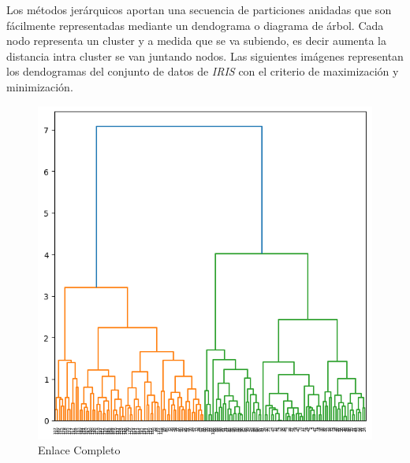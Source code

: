 \noindent Los métodos jerárquicos aportan una secuencia de particiones anidadas que son fácilmente representadas mediante un dendograma o diagrama de árbol. 
Cada nodo representa un cluster y a medida que se va subiendo, es decir aumenta la distancia intra cluster se van juntando nodos. Las siguientes imágenes representan los dendogramas del conjunto de datos de \emph{IRIS} \cite{Iris Fisher} con el criterio de maximización y minimización. 

\begin{figure}[ht]
  \centering

  \begin{minipage}{0.4\textwidth}
    \centering
    \includegraphics[width=\textwidth]{Documentos Extra/Imagenes/complete_linkage.png}
    \caption{Enlace Completo}
    \label{fig:imagen1}
  \end{minipage}
  \hfill
  \begin{minipage}{0.4\textwidth}
    \centering

\end{minipage}
\end{figure}

